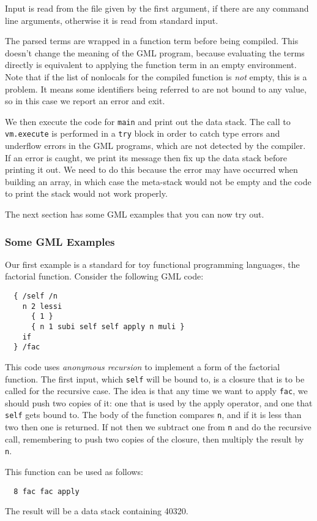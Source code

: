 Input is read from the file given by the first argument,
if there are any command line arguments,
otherwise it is read from standard input.

The parsed terms are wrapped in a function term before being compiled.
This doesn't change the meaning of the GML program,
because evaluating the terms directly is equivalent to
applying the function term in an empty environment.
Note that if the list of nonlocals for the compiled function
is \emph{not} empty, this is a problem.
It means some identifiers being referred to are not bound to any value,
so in this case we report an error and exit.

We then execute the code for \verb!main! and print out the data stack.
The call to \verb!vm.execute! is performed in a \verb!try! block
in order to catch type errors and underflow errors in the GML programs,
which are not detected by the compiler.
If an error is caught,
we print its message then fix up the data stack before printing it out.
We need to do this because the error may have occurred when building an array,
in which case the meta-stack would not be empty
and the code to print the stack would not work properly.

The next section has some GML examples that you can now try out.


\subsubsection{Some GML Examples\label{sec:gmlexamples}}

Our first example is a standard for toy functional programming languages,
the factorial function.
Consider the following GML code:
\begin{verbatim}
  { /self /n
    n 2 lessi
      { 1 }
      { n 1 subi self self apply n muli }
    if
  } /fac
\end{verbatim}
This code uses \emph{anonymous recursion} to implement
a form of the factorial function.
The first input, which \verb!self! will be bound to,
is a closure that is to be called for the recursive case.
The idea is that any time we want to apply \verb!fac!,
we should push two copies of it:
one that is used by the apply operator,
and one that \verb!self! gets bound to.
The body of the function compares \verb!n!,
and if it is less than two then one is returned.
If not then we subtract one from \verb!n! and do the recursive call,
remembering to push two copies of the closure,
then multiply the result by \verb!n!.

This function can be used as follows:
\begin{verbatim}
  8 fac fac apply
\end{verbatim}
The result will be a data stack containing 40320.

